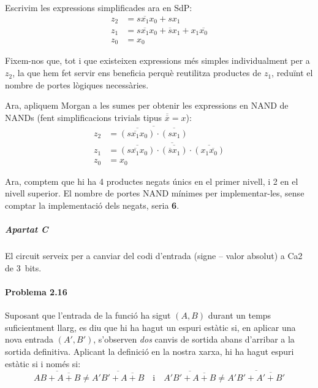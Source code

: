 Escrivim les expressions simplificades ara en SdP:
%
\begin{align*}
  z_2 &= s \overline{x_1} x_0 + s x_1 \\
  z_1 &= s \overline{x_1} x_0 + \overline{s} x_1 + x_1 \overline{x_0} \\
  z_0 &= x_0
\end{align*}

Fixem-nos que, tot i que existeixen expressions més simples individualment per a $z_2$, la que hem fet servir ens beneficia perquè reutilitza productes de $z_1$, reduïnt el nombre de portes lògiques necessàries.

Ara, apliquem Morgan a les sumes per obtenir les expressions en \textsf{NAND} de \textsf{NAND}s (fent simplificacions trivials tipus $\overline{\overline{x}} = x$):
%
\begin{align*}
  z_2 &= \overline{
    \overline{\left(s \overline{x_1} x_0\right)} \cdot
    \overline{\left(s x_1\right)}
  } \\
  z_1 &= \overline{
    \overline{\left(s \overline{x_1} x_0\right)} \cdot
    \overline{\left(\overline{s} x_1\right)} \cdot
    \overline{\left(x_1 \overline{x_0}\right)}
  } \\
  z_0 &= x_0
\end{align*}

Ara, comptem que hi ha 4 productes negats únics en el primer nivell, i 2 en el nivell superior. El nombre de portes \textsf{NAND} mínimes per implementar-les, sense comptar la implementació dels negats, seria \textbf{6}.


\subparagraph{Apartat C}

El circuit serveix per a canviar del codi d'entrada (signe -- valor absolut) a Ca2 de 3~bits.

\finishpage


\startpage
\paragraph{Problema 2.16}

Suposant que l'entrada de la funció ha sigut $(A,B)$ durant un temps suficientment llarg, es diu que hi ha hagut un espuri estàtic si, en aplicar una nova entrada $(A',B')$, s'observen \emph{dos} canvis de sortida abans d'arribar a la sortida definitiva. Aplicant la definició en la nostra xarxa, hi ha hagut espuri estàtic si i només si:
%
\begin{equation*}
  \overline{AB + \overline{A+B}} \neq \overline{A'B' + \overline{A+B}}
    \quad \text{i} \quad
  \overline{A'B' + \overline{A+B}} \neq \overline{A'B' + \overline{A'+B'}}
\end{equation*}

